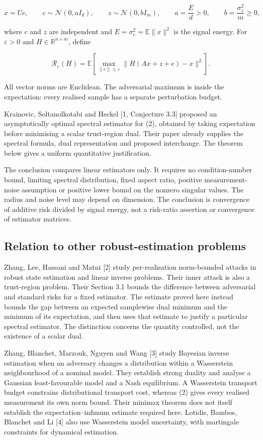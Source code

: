 \documentclass[11pt,a4paper]{article}
\begin{document}
\[
x=Uc,\qquad c\sim\mathcal N(0,aI_d),\qquad
z\sim\mathcal N(0,bI_m),\qquad
a=\frac E d>0,\qquad b=\frac{\sigma_z^2}{m}\ge0,
\tag{1}
\]

where \(c\) and \(z\) are independent and
\(E=\sigma_c^2=\mathbb E\|x\|^2\) is the signal energy. For
\(\varepsilon>0\) and \(H\in\mathbb R^{n\times m}\), define

\[
\mathcal R_\varepsilon(H)=
\mathbb E\left[\max_{\|e\|\le\varepsilon}
\|H(Ax+z+e)-x\|^2\right].
\tag{2}
\]

All vector norms are Euclidean. The adversarial maximum is inside the
expectation: every realised sample has a separate perturbation budget.

Krainovic, Soltanolkotabi and Heckel {[}1, Conjecture 3.3{]} proposed an
asymptotically optimal spectral estimator for (2), obtained by taking
expectation before minimising a scalar trust-region dual. Their paper
already supplies the spectral formula, dual representation and proposed
interchange. The theorem below gives a uniform quantitative
justification.

The conclusion compares linear estimators only. It requires no
condition-number bound, limiting spectral distribution, fixed aspect
ratio, positive measurement-noise assumption or positive lower bound on
the nonzero singular values. The radius and noise level may depend on
dimension. The conclusion is convergence of additive risk divided by
signal energy, not a risk-ratio assertion or convergence of estimator
matrices.

\hypertarget{relation-to-other-robust-estimation-problems}{%
\subsection{Relation to other robust-estimation
problems}\label{relation-to-other-robust-estimation-problems}}

Zhang, Lee, Hassani and Matni {[}2{]} study per-realisation norm-bounded
attacks in robust state estimation and linear inverse problems. Their
inner attack is also a trust-region problem. Their Section 3.1 bounds
the difference between adversarial and standard risks for a fixed
estimator. The estimate proved here instead bounds the gap between an
expected samplewise dual minimum and the minimum of its expectation, and
then uses that estimate to justify a particular spectral estimator. The
distinction concerns the quantity controlled, not the existence of a
scalar dual.

Zhang, Blanchet, Marzouk, Nguyen and Wang {[}3{]} study Bayesian inverse
estimation when an adversary changes a distribution within a Wasserstein
neighbourhood of a nominal model. They establish strong duality and
analyse a Gaussian least-favourable model and a Nash equilibrium. A
Wasserstein transport budget constrains distributional transport cost,
whereas (2) gives every realised measurement its own norm bound. Their
minimax theorem does not itself establish the expectation--infimum
estimate required here. Lotidis, Bambos, Blanchet and Li {[}4{]} also
use Wasserstein model uncertainty, with martingale constraints for
dynamical estimation.
\end{document}
